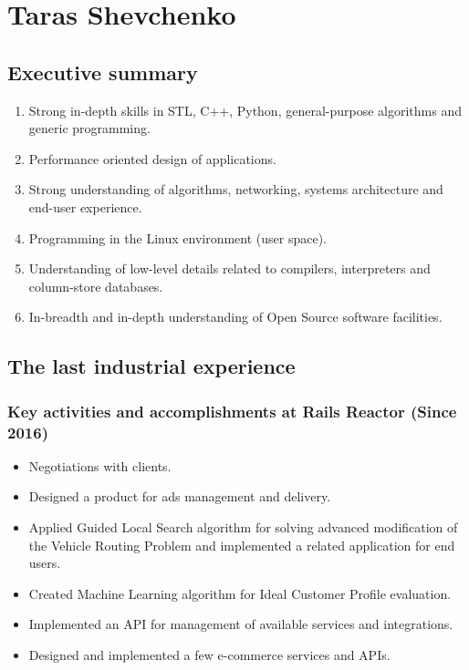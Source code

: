 \documentclass[a4paper,12pt,final]{extreport}
\begin{document}
\section{Taras Shevchenko}
\subsection{Executive summary}
\begin{enumerate}
  \item Strong in-depth skills in STL, C++, Python, general-purpose algorithms and generic programming.
  \item Performance oriented design of applications.
  \item Strong understanding of algorithms, networking, systems architecture and end-user experience.
  \item Programming in the Linux environment (user space).
  \item Understanding of low-level details related to compilers, interpreters and column-store databases.
  \item In-breadth and in-depth understanding of Open Source software facilities.
\end{enumerate}

\subsection{The last industrial experience}
\subsubsection{Key activities and accomplishments at Rails Reactor (Since 2016)}
\begin{itemize}
  \item Negotiations with clients.
  \item Designed a product for ads management and delivery.
  \item Applied Guided Local Search algorithm for solving advanced modification
        of the Vehicle Routing Problem and implemented a related application
        for end users.
  \item Created Machine Learning algorithm for Ideal Customer Profile evaluation.
  \item Implemented an API for management of available services and integrations.
  \item Designed and implemented a few e-commerce services and APIs.
\end{itemize}
\end{document}
